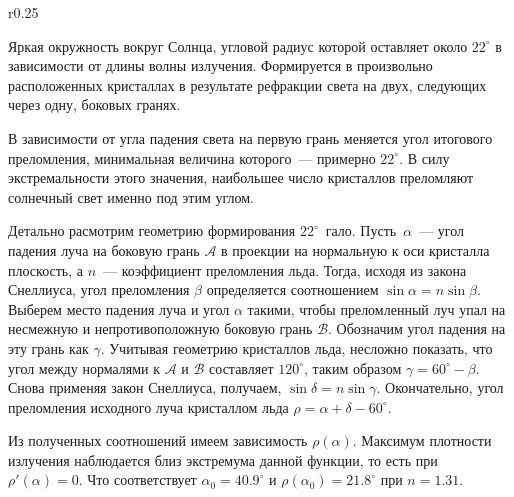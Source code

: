\begin{wrapfigure}[11]{r}{0.25\tw}
	\caption{}
	\label{}
\end{wrapfigure}
Яркая окружность вокруг Солнца, угловой радиус которой оставляет около $22^\circ$ в зависимости от длины волны излучения. Формируется в произвольно расположенных кристаллах в результате рефракции света на двух, следующих через одну, боковых гранях.

В зависимости от угла падения света на первую грань меняется угол итогового преломления, минимальная величина которого~--- примерно $22^\circ$. В силу экстремальности этого значения, наибольшее число кристаллов преломляют солнечный свет именно под этим углом.

Детально расмотрим геометрию формирования $22^\circ$~гало. Пусть~$\alpha$~--- угол падения луча на боковую грань $\mathcal{A}$ в проекции на нормальную к оси кристалла плоскость, а $n$~--- коэффициент преломления льда. Тогда, исходя из закона Снеллиуса, угол преломления $\beta$ определяется соотношением $\sin \alpha = n \sin \beta$. Выберем место падения луча и угол $\alpha$ такими, чтобы преломленный луч упал на несмежную и непротивоположную боковую грань $\mathcal{B}$. Обозначим угол падения на эту грань как $\gamma$. Учитывая геометрию кристаллов льда, несложно показать, что угол между нормалями к $\mathcal{A}$ и $\mathcal{B}$ составляет $120^\circ$, таким образом $\gamma = 60^\circ - \beta$. Снова применяя закон Снеллиуса, получаем, $\sin \delta = n \sin \gamma$. Окончательно, угол преломления исходного луча кристаллом льда $\rho =  \alpha + \delta - 60^\circ$.

Из полученных соотношений имеем зависимость $\rho(\alpha)$. Максимум плотности излучения наблюдается близ экстремума данной функции, то есть при $\rho'(\alpha) = 0$. Что соответствует $\alpha_0 = 40.9^\circ$ и $\rho(\alpha_0) = 21.8^\circ$ при $n=1.31$.